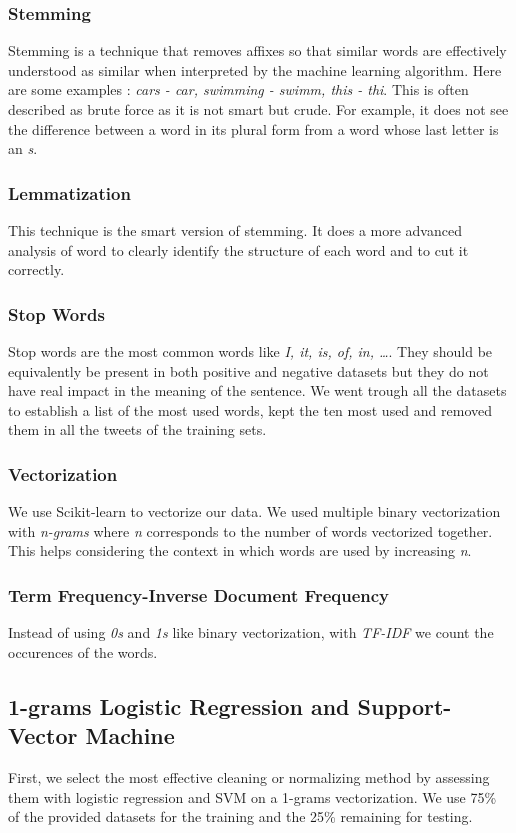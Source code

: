 \documentclass[11pt, a4paper, twocolumn]{article}
\begin{document}
\subsubsection{Stemming}
Stemming is a technique that removes affixes so that similar words are effectively understood as similar when interpreted by the machine learning algorithm. Here are some examples : \textit{cars - car, swimming - swimm, this - thi}. This is often described as brute force as it is not smart but crude. For example, it does not see the difference between a word in its plural form from a word whose last letter is an \textit{s}.

\subsubsection{Lemmatization}
This technique is the smart version of stemming. It does a more advanced analysis of word to clearly identify the structure of each word and to cut it correctly.

\subsubsection{Stop Words}
Stop words are the most common words like \textit{I, it, is, of, in, \dots}. They should be equivalently be present in both positive and negative datasets but they do not have real impact in the meaning of the sentence. We went trough all the datasets to establish a list of the most used words, kept the ten most used and removed them in all the tweets of the training sets.

\subsubsection{Vectorization}
We use Scikit-learn to vectorize our data. We used multiple binary vectorization with \textit{n-grams} where \textit{n} corresponds to the number of words vectorized together. This helps considering the context in which words are used by increasing \textit{n}.

\subsubsection{Term Frequency-Inverse Document Frequency}
Instead of using \textit{0s} and \textit{1s} like binary vectorization, with \textit{TF-IDF} we count the occurences of the words.

\subsection{1-grams Logistic Regression and Support-Vector Machine}
First, we select the most effective cleaning or normalizing method by assessing them with logistic regression and SVM on a 1-grams vectorization. We use 75\% of the provided datasets for the training and the 25\% remaining for testing.
\end{document}
